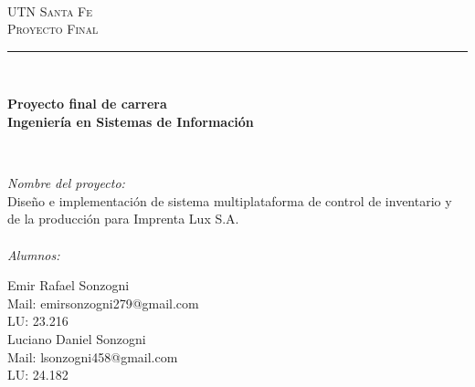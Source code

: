\documentclass[a4paper, 12pt,twoside]{report}  %
\numberwithin{equation}{subsection} %
\begin{document}
\begin{titlepage} %

\newcommand{\HRule}{\rule{\linewidth}{0.5mm}} %

 \begin{center} %

\textsc{\LARGE \\%
UTN Santa Fe}\\[1cm] %
\textsc{\large Proyecto Final}\\[0.3cm] %

\HRule \\[1cm]   %
\newcommand{\grad}{$^{\circ}$}	%


{ \huge \bfseries Proyecto final de carrera\\
Ingeniería en Sistemas de Información}\\[1cm] %
\end{center}
\\[0cm]

\large

\noindent\emph{Nombre del proyecto:}\\
\indent Diseño e implementación de sistema multiplataforma de control de inventario y de la producción para Imprenta Lux S.A.\\

\\[1cm]

\noindent\emph{Alumnos:}

\noindent Emir Rafael Sonzogni\\
\indent Mail: emirsonzogni279@gmail.com\\
\indent LU: 23.216\\
Luciano Daniel Sonzogni\\
\indent Mail: lsonzogni458@gmail.com\\
\indent LU: 24.182\\


\end{titlepage}
\end{document}
